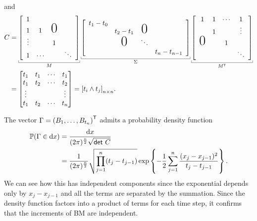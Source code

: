 \documentclass[12pt]{report}
\begin{document}
and
\begin{align*}
	C&=   \ubracketthin{ \left[
	\begin{array}{cccc}
		1                                    \\
		1& 1              & \text{\huge0}\\
		\vdots&               & 1                \\
		1&             \cdots    &   & \ddots
	\end{array}
	\right]}_{M}\ubracketthin{\left[
	\begin{array}{cccc}
		t_{1}-t_{0}                                    \\
		& t_{2}-t_{1}              & \smash{\text{\huge0}}\\
		&\smash{\text{\huge0}}               & \ddots                \\
		&               &   & t_{n}-t_{n-1}
	\end{array}
	\right]}_{\Sigma}\ubracketthin{\left[
	\begin{array}{cccc}
		1                 &1&\cdots        &1           \\
		& 1              & &\vdots\\
		\text{\huge0}&               & 1                \\
		&              &   & \ddots
	\end{array}
	\right]}_{M^{\trsp}}\\
	&=\begin{bmatrix}
		t_{1}&t_{1}&\cdots&t_1\\
		t_{1}&t_{2}&\cdots&t_{2}\\
		\vdots&&&\vdots\\
		t_{1}&t_{2}&\cdots&t_{n}
	\end{bmatrix}={\left[t_{i}\wedge t_{j}\right]}_{n\times n}.
\end{align*}
\begin{remark}
	The vector $\Gamma=\left(B_{1},\ldots,B_{t_{n}}\right)^{\mathsf{T}}$ admits a probability density function\footnotemark
	\begin{align*}
		\mathbb{P}(\Gamma\in\mathop{}\!\mathrm{d} x)&=\frac{\mathop{}\!\mathrm{d} x}{(2\pi)^{\frac{n}{2}}\sqrt{\mathsf{det~}C}}\\
		&=\frac{1}{(2\pi)^{\frac{n}{2}}}\sqrt{\prod_{j=1}^{n}(t_{j}-t_{j-1})}\exp\left\{-\frac{1}{2}\sum_{j=1}^{n}\frac{(x_{j}-x_{j-1})^{2}}{t_{j}-t_{j-1}}\right\}.
	\end{align*}
	We can see how this has independent components since the exponential depends only by $x_{j}-x_{j-1}$ and all the terms are separated by the summation. Since the density function factors into a product of terms for each time step, it confirms that the increments of BM are independent.
\end{remark}
\end{document}
